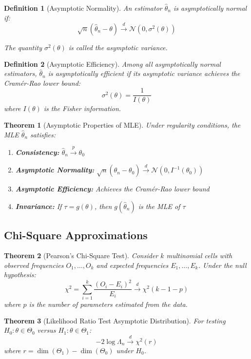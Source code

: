 \documentclass[12pt,a4paper]{article}
\newtheorem{theorem}{Theorem}[section]
\newtheorem{definition}{Definition}[section]
\theoremstyle{remark}
\begin{document}
\begin{definition}[Asymptotic Normality]
An estimator $\hat{\theta}_n$ is asymptotically normal if:
$$\sqrt{n}(\hat{\theta}_n - \theta) \stackrel{d}{\to} \mathcal{N}(0, \sigma^2(\theta))$$

The quantity $\sigma^2(\theta)$ is called the asymptotic variance.
\end{definition}

\begin{definition}[Asymptotic Efficiency]
Among all asymptotically normal estimators, $\hat{\theta}_n$ is asymptotically efficient if its asymptotic variance achieves the Cramér-Rao lower bound:
$$\sigma^2(\theta) = \frac{1}{I(\theta)}$$
where $I(\theta)$ is the Fisher information.
\end{definition}

\begin{theorem}[Asymptotic Properties of MLE]
Under regularity conditions, the MLE $\hat{\theta}_n$ satisfies:
\begin{enumerate}
\item \textbf{Consistency:} $\hat{\theta}_n \stackrel{p}{\to} \theta_0$
\item \textbf{Asymptotic Normality:} $\sqrt{n}(\hat{\theta}_n - \theta_0) \stackrel{d}{\to} \mathcal{N}(0, I^{-1}(\theta_0))$
\item \textbf{Asymptotic Efficiency:} Achieves the Cramér-Rao lower bound
\item \textbf{Invariance:} If $\tau = g(\theta)$, then $g(\hat{\theta}_n)$ is the MLE of $\tau$
\end{enumerate}
\end{theorem}

\subsection{Chi-Square Approximations}

\begin{theorem}[Pearson's Chi-Square Test]
Consider $k$ multinomial cells with observed frequencies $O_1, \ldots, O_k$ and expected frequencies $E_1, \ldots, E_k$. Under the null hypothesis:
$$\chi^2 = \sum_{i=1}^k \frac{(O_i - E_i)^2}{E_i} \stackrel{d}{\to} \chi^2(k-1-p)$$
where $p$ is the number of parameters estimated from the data.
\end{theorem}

\begin{theorem}[Likelihood Ratio Test Asymptotic Distribution]
For testing $H_0: \theta \in \Theta_0$ versus $H_1: \theta \in \Theta_1$:
$$-2\log\Lambda_n \stackrel{d}{\to} \chi^2(r)$$
where $r = \dim(\Theta_1) - \dim(\Theta_0)$ under $H_0$.
\end{theorem}
\end{document}
